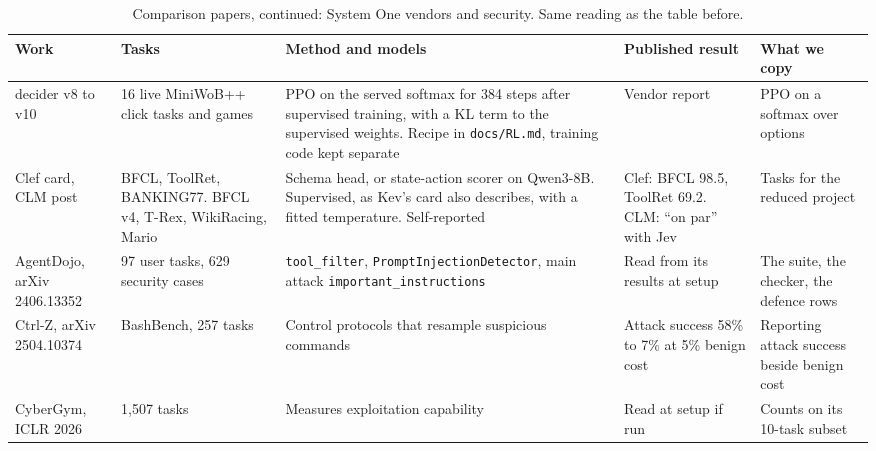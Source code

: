 \documentclass[10pt]{article}
\begin{document}
\begin{table}[H]
\scriptsize
\caption{Comparison papers, continued: System One vendors and security. Same reading as the table before.}
\begin{tabularx}{\linewidth}{@{}P{2.3cm} P{4.1cm} P{4.3cm} L P{4.6cm}@{}}
\toprule
Work & Tasks & Method and models & Published result & What we copy \\
\midrule
decider v8 to v10 & 16 live MiniWoB++ click tasks and games & PPO on the served softmax for 384 steps after supervised training, with a KL term to the supervised weights. Recipe in \texttt{docs/RL.md}, training code kept separate & Vendor report & PPO on a softmax over options \\
Clef card, CLM post & BFCL, ToolRet, BANKING77. BFCL v4, T-Rex, WikiRacing, Mario & Schema head, or state-action scorer on Qwen3-8B. Supervised, as Kev's card also describes, with a fitted temperature. Self-reported & Clef: BFCL 98.5, ToolRet 69.2. CLM: ``on par'' with Jev & Tasks for the reduced project \\
AgentDojo, arXiv 2406.13352 & 97 user tasks, 629 security cases & \texttt{tool\_filter}, \texttt{PromptInjectionDetector}, main attack \texttt{important\_instructions} & Read from its results at setup & The suite, the checker, the defence rows \\
Ctrl-Z, arXiv 2504.10374 & BashBench, 257 tasks & Control protocols that resample suspicious commands & Attack success 58\% to 7\% at 5\% benign cost & Reporting attack success beside benign cost \\
CyberGym, ICLR 2026 & 1,507 tasks & Measures exploitation capability & Read at setup if run & Counts on its 10-task subset \\
\bottomrule
\end{tabularx}
\end{table}
\end{document}
